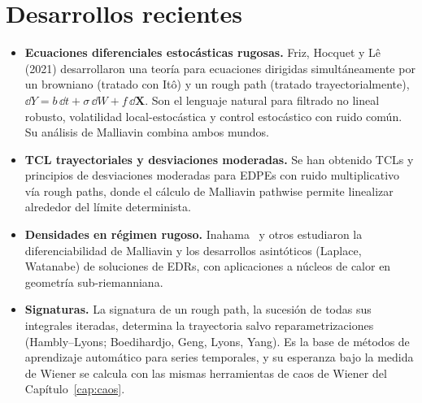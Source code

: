 \section{Desarrollos recientes}
\begin{itemize}
  \item \textbf{Ecuaciones diferenciales estocásticas rugosas.} Friz, Hocquet y Lê (2021) desarrollaron
  una teoría para ecuaciones dirigidas simultáneamente por un browniano (tratado
  con Itô) y un rough path (tratado trayectorialmente), $\dd Y=b\,\dd t+\sigma\,\dd W+f\,\dd\mathbf X$. Son
  el lenguaje natural para filtrado no lineal robusto, volatilidad local-estocástica y control
  estocástico con ruido común. Su análisis de Malliavin combina ambos mundos.
  \item \textbf{TCL trayectoriales y desviaciones moderadas.} Se han obtenido TCLs y principios
  de desviaciones moderadas para EDPEs con ruido multiplicativo vía rough paths, donde
  el cálculo de Malliavin pathwise permite linealizar alrededor del límite determinista.
  \item \textbf{Densidades en régimen rugoso.} Inahama~\cite{Inahama14} y otros estudiaron la diferenciabilidad
  de Malliavin y los desarrollos asintóticos (Laplace, Watanabe) de soluciones de EDRs, con
  aplicaciones a núcleos de calor en geometría sub-riemanniana.
  \item \textbf{Signaturas.} La signatura de un rough path, la sucesión de todas sus integrales iteradas,
  determina la trayectoria salvo reparametrizaciones (Hambly--Lyons; Boedihardjo, Geng,
  Lyons, Yang). Es la base de métodos de aprendizaje automático para series temporales, y
  su esperanza bajo la medida de Wiener se calcula con las mismas herramientas de caos de
  Wiener del Capítulo~\ref{cap:caos}.
\end{itemize}
